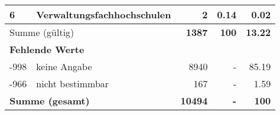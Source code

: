 \begin{longtable}{lXrrr}
     6 &
     \multicolumn{1}{X}{ Verwaltungsfachhochschulen   } &


       \num{2} &
       \num[round-mode=places,round-precision=2]{0.14} &
         \num[round-mode=places,round-precision=2]{0.02} \\
     \midrule
     \multicolumn{2}{l}{Summe (gültig)} &
       \textbf{\num{1387}} &
     \textbf{\num{100}} &
       \textbf{\num[round-mode=places,round-precision=2]{13.22}} \\
     \multicolumn{5}{l}{\textbf{Fehlende Werte}}\\
       -998 &
       keine Angabe &
         \num{8940} &
        - &
         \num[round-mode=places,round-precision=2]{85.19} \\
       -966 &
       nicht bestimmbar &
         \num{167} &
        - &
         \num[round-mode=places,round-precision=2]{1.59} \\
     \midrule
     \multicolumn{2}{l}{\textbf{Summe (gesamt)}} &
          \textbf{\num{10494}} &
        \textbf{-} &
        \textbf{\num{100}} \\
     \bottomrule
     \end{longtable}
     
